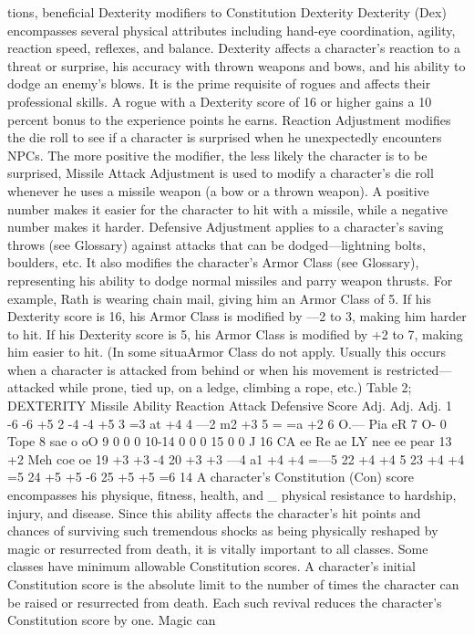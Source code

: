 \documentclass[../main.tex]{subfiles}
\begin{document}
\begin{multicols}{3}
tions, beneficial Dexterity modifiers to Constitution
Dexterity
Dexterity (Dex) encompasses several physical attributes
including hand-eye coordination, agility,
reaction speed, reflexes, and balance. Dexterity affects a character's reaction to a
threat or surprise, his accuracy with thrown
weapons and bows, and his ability to dodge
an enemy's blows. It is the prime requisite of
rogues and affects their professional skills.
A rogue with a Dexterity score of 16 or higher gains a 10 percent bonus to the experience
points he earns.
Reaction Adjustment modifies the die roll
to see if a character is surprised when he
unexpectedly encounters NPCs. The more
positive the modifier, the less likely the
character is to be surprised,
Missile Attack Adjustment is used to
modify a character's die roll whenever he
uses a missile weapon (a bow or a thrown
weapon). A positive number makes it easier
for the character to hit with a missile, while
a negative number makes it harder.
Defensive Adjustment applies to a character’s saving throws (see Glossary) against
attacks that can be dodged—lightning bolts,
boulders, etc. It also modifies the character's
Armor Class (see Glossary), representing
his ability to dodge normal missiles and parry weapon thrusts. For example, Rath is
wearing chain mail, giving him an Armor
Class of 5. If his Dexterity score is 16, his
Armor Class is modified by —2 to 3, making him harder to hit. If his Dexterity score
is 5, his Armor Class is modified by +2 to 7,
making him easier to hit. (In some situaArmor Class do not apply. Usually this
occurs when a character is attacked from
behind or when his movement is
restricted—attacked while prone, tied up,
on a ledge, climbing a rope, etc.)
Table 2; DEXTERITY
Missile
Ability Reaction Attack Defensive
Score Adj. Adj. Adj.
1 -6 -6 +5
2 -4 -4 +5
3 =3 at +4
4 —2 m2 +3
5 = =a +2
6 O.— Pia eR
7 O- 0 Tope
8 sae o oO
9 0 0 0
10-14 0 0 0
15 0 0 J
16 CA ee Re ae
LY nee ee pear
13 +2 Meh coe oe
19 +3 +3 -4
20 +3 +3 —4
a1 +4 +4 =—5
22 +4 +4 5
23 +4 +4 =5
24 +5 +5 -6
25 +5 +5 =6
14
A character's Constitution (Con) score encompasses his physique, fitness, health, and _ physical
resistance to hardship, injury, and disease.
Since this ability affects the character's hit
points and chances of surviving such tremendous shocks as being physically
reshaped by magic or resurrected from
death, it is vitally important to all classes.
Some classes have minimum allowable
Constitution scores.
A character's initial Constitution score is
the absolute limit to the number of times the
character can be raised or resurrected from
death. Each such revival reduces the character's Constitution score by one. Magic can

\end{multicols}
\end{document}
